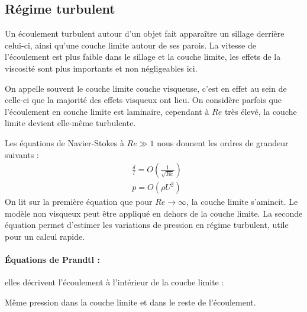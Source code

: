 \subsection{Régime turbulent}
Un écoulement turbulent autour d'un objet fait apparaître un sillage derrière celui-ci, ainsi qu'une couche limite autour de ses parois. La vitesse de l'écoulement est plus faible dans le sillage et la couche limite, les effets de la viscosité sont plus importants et non négligeables ici.

On appelle souvent le couche limite couche visqueuse, c'est en effet au sein de celle-ci que la majorité des effets visqueux ont lieu. On considère parfois que l'écoulement en couche limite est laminaire, cependant à $Re$ très élevé, la couche limite devient elle-même turbulente.

Les équations de Navier-Stokes à $Re \gg 1$ nous donnent les ordres de grandeur suivants :
%
\begin{align}
 & \frac {\delta}{l} = O \left( \frac{1}{\sqrt{Re}} \right) \\
 & p = O \left( \rho U^2 \right)
\end{align}
%
On lit sur la première équation que pour $Re \to \infty$, la couche limite s'amincit. Le modèle non visqueux peut être appliqué en dehors de la couche limite. La seconde équation permet d'estimer les variations de pression en régime turbulent, utile pour un calcul rapide.

\paragraph{Équations de Prandtl :}elles décrivent l'écoulement à l'intérieur de la couche limite :

Même pression dans la couche limite et dans le reste de l'écoulement.


